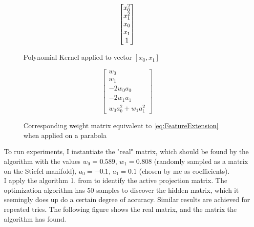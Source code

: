 \def\WtoPhi{
\begin{bmatrix}
	w_0 \\
    w_1 \\
	-2 w_0 a_0 \\
	-2 w_1 a_1 \\
	w_0 a_0^2 + w_1 a_1^2
\end{bmatrix}}

\begin{figure}[h]

\begin {minipage}{0.47\textwidth}
  \centering
  \begin{equation}
    \begin{bmatrix} x_0^2 \\ x_1^2 \\ x_0 \\ x_1 \\ 1 \end{bmatrix}
  \end{equation}
  \caption{Polynomial Kernel applied to vector $[x_0, x_1]$}
\end{minipage}
\hfill
\begin {minipage}{0.47\textwidth}
  \centering
  \begin{equation}
    \WtoPhi
  \end{equation}
  \caption{Corresponding weight matrix equivalent to \ref{eq:FeatureExtension} when applied on a parabola}
\end{minipage}

\end{figure}

To run experiments, I instantiate the "real" matrix, which should be found by the algorithm with the values $w_0 = 0.589$, $w_1 = 0.808$ (randomly sampled as a matrix on the Stiefel manifold), $a_0 = -0.1$, $a_1 = 0.1$ (chosen by me as coefficients). \\

I apply the algorithm 1. from \citep{Tripathy} to identify the active projection matrix.
The optimization algorithm has 50 samples to discover the hidden matrix, which it seemingly does up do a certain degree of accuracy.
Similar results are achieved for repeated tries.
The following figure shows the real matrix, and the matrix the algorithm has found.

\def\realW{
\begin{bmatrix}
	0.589 \\
    0.808 \\
	0.118 \\
	-0.162 \\
	0.823
\end{bmatrix}}

\def\okW1{
\begin{bmatrix}
	-0.355 \\
    	-0.533 \\
    	-0.908 \\
    	0.099 \\
    -0.756 
\end{bmatrix}}


